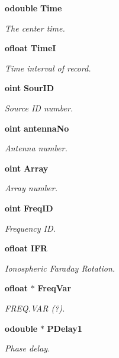 \begin{CompactItemize}
{\bf odouble} {\bf Time}
\begin{CompactList}\small\item\em The center time. \item\end{CompactList}\item 
{\bf ofloat} {\bf Time\-I}
\begin{CompactList}\small\item\em Time interval of record. \item\end{CompactList}\item 
{\bf oint} {\bf Sour\-ID}
\begin{CompactList}\small\item\em Source ID number. \item\end{CompactList}\item 
{\bf oint} {\bf antenna\-No}
\begin{CompactList}\small\item\em Antenna number. \item\end{CompactList}\item 
{\bf oint} {\bf Array}
\begin{CompactList}\small\item\em Array number. \item\end{CompactList}\item 
{\bf oint} {\bf Freq\-ID}
\begin{CompactList}\small\item\em Frequency ID. \item\end{CompactList}\item 
{\bf ofloat} {\bf IFR}
\begin{CompactList}\small\item\em Ionospheric Faraday Rotation. \item\end{CompactList}\item 
{\bf ofloat} $\ast$ {\bf Freq\-Var}
\begin{CompactList}\small\item\em FREQ.VAR (?). \item\end{CompactList}\item 
{\bf odouble} $\ast$ {\bf PDelay1}
\begin{CompactList}\small\item\em Phase delay. \item\end{CompactList}\item 

\end{CompactItemize}
